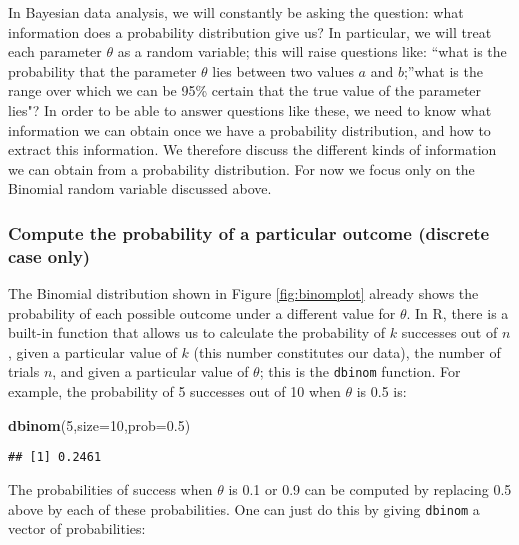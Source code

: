 \documentclass[12pt,]{krantz}
\newenvironment{Shaded}{\begin{snugshade}}{\end{snugshade}}
\newcommand{\DataTypeTok}[1]{\textcolor[rgb]{0.13,0.29,0.53}{#1}}
\newcommand{\DecValTok}[1]{\textcolor[rgb]{0.00,0.00,0.81}{#1}}
\newcommand{\FloatTok}[1]{\textcolor[rgb]{0.00,0.00,0.81}{#1}}
\newcommand{\KeywordTok}[1]{\textcolor[rgb]{0.13,0.29,0.53}{\textbf{#1}}}
\newcommand{\NormalTok}[1]{#1}
\begin{document}
In Bayesian data analysis, we will constantly be asking the question: what information does a probability distribution give us? In particular, we will treat each parameter \(\theta\) as a random variable; this will raise questions like: ``what is the probability that the parameter \(\theta\) lies between two values \(a\) and \(b\);''what is the range over which we can be 95\% certain that the true value of the parameter lies"? In order to be able to answer questions like these, we need to know what information we can obtain once we have a probability distribution, and how to extract this information. We therefore discuss the different kinds of information we can obtain from a probability distribution. For now we focus only on the Binomial random variable discussed above.

\hypertarget{compute-the-probability-of-a-particular-outcome-discrete-case-only}{%
\subsubsection{Compute the probability of a particular outcome (discrete case only)}\label{compute-the-probability-of-a-particular-outcome-discrete-case-only}}

The Binomial distribution shown in Figure \ref{fig:binomplot} already shows the probability of each possible outcome under a different value for \(\theta\). In R, there is a built-in function that allows us to calculate the probability of \(k\) successes out of \(n\), given a particular value of \(k\) (this number constitutes our data), the number of trials \(n\), and given a particular value of \(\theta\); this is the \texttt{dbinom} function. For example, the probability of 5 successes out of 10 when \(\theta\) is 0.5 is:

\begin{Shaded}
\begin{Highlighting}[]
\KeywordTok{dbinom}\NormalTok{(}\DecValTok{5}\NormalTok{,}\DataTypeTok{size=}\DecValTok{10}\NormalTok{,}\DataTypeTok{prob=}\FloatTok{0.5}\NormalTok{)}
\end{Highlighting}
\end{Shaded}

\begin{verbatim}
## [1] 0.2461
\end{verbatim}

The probabilities of success when \(\theta\) is 0.1 or 0.9 can be computed by replacing 0.5 above by each of these probabilities. One can just do this by giving \texttt{dbinom} a vector of probabilities:
\end{document}
